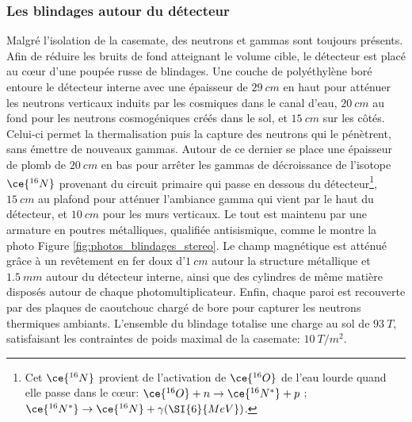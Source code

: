 \subsubsection*{Les blindages autour du détecteur} 

Malgré l'isolation de la casemate, des neutrons et gammas sont toujours présents. Afin de réduire les bruits de fond atteignant le volume cible, le détecteur est placé au c\oe ur d'une poupée russe de blindages. Une couche de polyéthylène boré entoure le détecteur interne avec une épaisseur de $\SI{29}{cm}$ en haut pour atténuer les neutrons verticaux induits par les cosmiques dans le canal d'eau, $\SI{20}{cm}$ au fond pour les neutrons cosmogéniques créés dans le sol, et $\SI{15}{cm}$ sur les côtés. Celui-ci permet la thermalisation puis la capture des neutrons qui le pénètrent, sans émettre de nouveaux gammas. Autour de ce dernier se place une épaisseur de plomb de $\SI{20}{cm}$ en bas pour arrêter les gammas de décroissance de l'isotope $\ce{^{16}N}$ provenant du circuit primaire qui passe en dessous du détecteur\footnote{Cet $\ce{^{16}N}$ provient de l'activation de $\ce{^{16}O}$ de l'eau lourde quand elle passe dans le c\oe ur: $\ce{^{16}O} + n \rightarrow \ce{^{16}N^*} + p$ ; $\ce{^{16}N^*} \rightarrow \ce{^{16}N} + \gamma(\SI{6}{MeV})$.}, $\SI{15}{cm}$ au plafond pour atténuer l'ambiance gamma qui vient par le haut du détecteur, et $\SI{10}{cm}$ pour les murs verticaux. Le tout est maintenu par une armature en poutres métalliques, qualifiée antisismique, comme le montre la photo Figure \ref{fig:photos_blindages_stereo}. Le champ magnétique est atténué grâce à un revêtement en fer doux d'$\SI{1}{cm}$ autour la structure métallique et $\SI{1,5}{mm}$ autour du détecteur interne, ainsi que des cylindres de même matière disposés autour de chaque photomultiplicateur. Enfin, chaque paroi est recouverte par des plaques de caoutchouc chargé de bore pour capturer les neutrons thermiques ambiants. L'ensemble du blindage totalise une charge au sol de $\SI{93}{T}$, satisfaisant les contraintes de poids maximal de la casemate: $\SI{10}{T/m^2}$.\\ 

